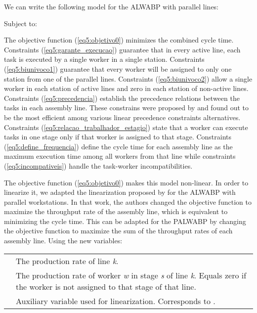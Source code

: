 \documentclass{singlecol-new}
\begin{document}
\vspace{0.2cm}


We can write the following model for the ALWABP with parallel lines:



Subject to:





The objective function (\ref{eq5:objetivo0}) minimizes the combined cycle time. Constraints (\ref{eq5:garante_execucao}) guarantee that in every active line, each task is executed by a single worker in a single station. Constraints (\ref{eq5:biunivoco1}) guarantee that every worker will be assigned to only one station from one of the parallel lines. Constraints (\ref{eq5:biunivoco2}) allow a single worker in each station of active lines and zero in each station of non-active lines. Constraints (\ref{eq5:precedencia}) establish the precedence relations between the tasks in each assembly line. These constrains were proposed by \cite{Ritt2011} and found out to be the most efficient among various linear precedence constraints alternatives. Constraints (\ref{eq5:relacao_trabalhador_estagio}) state that a worker can execute tasks in one stage only if that worker is assigned to that stage.  Constraints (\ref{eq5:define_frequencia}) define the cycle time for each assembly line as the maximum execution time among all workers from that line while constraints (\ref{eq5:incompativeis}) handle the task-worker incompatibilities.

The objective function (\ref{eq5:objetivo0}) makes this model non-linear. In order to linearize it, we adapted the linearization proposed by \cite{araujo12two} for the ALWABP with parallel workstations. In that work, the authors changed the objective function to maximize the throughput rate of the assembly line, which is equivalent to minimizing the cycle time. This can be adapted for the PALWABP by changing the objective function to maximize the sum of the throughput rates of each assembly line. Using the new variables:

\begin{tabular}[t]{lp{10cm}}
 & The production rate of line \textit{k}.\\
 & The production rate of worker \textit{w} in stage \textit{s} of line \textit{k}. Equals zero if the worker is not assigned to that stage of that line.\\
 & Auxiliary variable used for linearization. Corresponds to .\\ 
\end{tabular}
\end{document}
